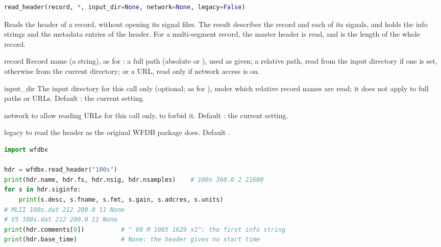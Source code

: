 \begin{lstlisting}[language=Python,style=signature]
read_header(record, *, input_dir=None, network=None, legacy=False)
\end{lstlisting}
Reads the header of a record, without opening its signal files. The result describes the
record and each of its signals, and holds the info strings and the metadata entries of the
header. For a multi-segment record, the master header is read, and  is the
length of the whole record.
\begin{params}
\item[record] Record name (a string), as for : a full path (absolute or
  \code{\textasciitilde}), used as given; a relative path, read from the input directory
  if one is set, otherwise from the current directory; or a URL, read only if network
  access is on.
\item[input\_dir] The input directory for this call only (optional; as for
  ), under which relative record names are read; it does not apply to
  full paths or URLs. Default : the current setting.
\item[network]  to allow reading URLs for this call only,  to forbid
  it. Default : the current setting.
\item[legacy]  to read the header as the original WFDB package does. Default
  .
\end{params}
\begin{lstlisting}[language=Python,style=example]
import wfdbx

hdr = wfdbx.read_header("100s")
print(hdr.name, hdr.fs, hdr.nsig, hdr.nsamples)    # 100s 360.0 2 21600
for s in hdr.siginfo:
    print(s.desc, s.fname, s.fmt, s.gain, s.adcres, s.units)
# MLII 100s.dat 212 200.0 11 None
# V5 100s.dat 212 200.0 11 None
print(hdr.comments[0])          # " 69 M 1085 1629 x1": the first info string
print(hdr.base_time)            # None: the header gives no start time
\end{lstlisting}

